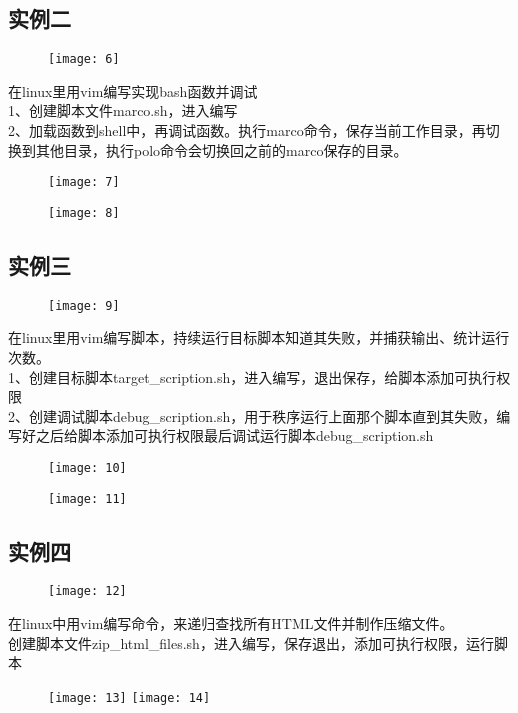 \documentclass[12pt,letterpaper]{article}
\begin{document}
\subsection{实例二}
\begin{figure}[H]
\centering
\texttt{[image: 6]}
\end{figure}
在linux里用vim编写实现bash函数并调试\\
1、创建脚本文件marco.sh，进入编写\\
2、加载函数到shell中，再调试函数。执行marco命令，保存当前工作目录，再切换到其他目录，执行polo命令会切换回之前的marco保存的目录。
\begin{figure}[H]
\centering
\texttt{[image: 7]}
\end{figure}
\vspace{-6mm}
\begin{figure}[H]
\centering
\texttt{[image: 8]}
\end{figure}

\subsection{实例三}
\begin{figure}[H]
\centering
\texttt{[image: 9]}
\end{figure}
在linux里用vim编写脚本，持续运行目标脚本知道其失败，并捕获输出、统计运行次数。\\
1、创建目标脚本target\_scription.sh，进入编写，退出保存，给脚本添加可执行权限\\
2、创建调试脚本debug\_scription.sh，用于秩序运行上面那个脚本直到其失败，编写好之后给脚本添加可执行权限最后调试运行脚本debug\_scription.sh
\begin{figure}[H]
\centering
\texttt{[image: 10]}
\end{figure}
\vspace{-6mm}
\begin{figure}[H]
\centering
\texttt{[image: 11]}
\end{figure}

\subsection{实例四}
\begin{figure}[H]
\centering
\texttt{[image: 12]}
\end{figure}
在linux中用vim编写命令，来递归查找所有HTML文件并制作压缩文件。\\
创建脚本文件zip\_html\_files.sh，进入编写，保存退出，添加可执行权限，运行脚本
\begin{figure}[H]
\centering
\texttt{[image: 13]}
\texttt{[image: 14]}
\end{figure}
\end{document}
